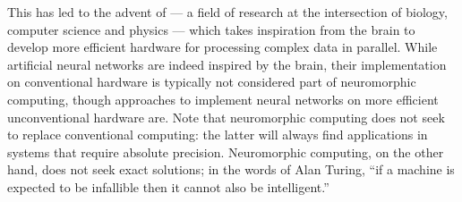 This has led to the advent of  --- a field of research at the intersection of biology, computer science and physics --- which takes inspiration from the brain to develop more efficient hardware for processing complex data in parallel.
While artificial neural networks are indeed inspired by the brain, their implementation on conventional hardware is typically not considered part of neuromorphic computing, though approaches to implement neural networks on more efficient unconventional hardware are. %
Note that neuromorphic computing does not seek to replace conventional computing: the latter will always find applications in systems that require absolute precision. %
Neuromorphic computing, on the other hand, does not seek exact solutions; in the words of Alan Turing, ``if a machine is expected to be infallible then it cannot also be intelligent.''

\vspace{-1.5em}
\vspace{-1em}

